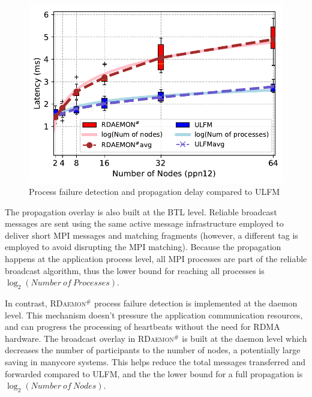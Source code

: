 \documentclass[sigconf]{acmart}
\newcommand{\ulfm}[0]{\textsc{ULFM}\xspace}
\newcommand{\mpi}[0]{\textsc{MPI}\xspace}
\newcommand{\ourwork}[0]{\textsc{RDaemon}\ensuremath{^\#}\xspace}
\begin{document}
\begin{figure}[h]
  \centering
  \includegraphics[width=\linewidth]{Process_Failure_log_fit.pdf}
  \caption{Process failure detection and propagation delay compared to \ulfm}
  \label{fig:proc_failure_nacl}
\end{figure}

The propagation overlay is also built at the BTL level. Reliable broadcast
messages are sent using the same active message infrastructure employed to
deliver short \mpi messages and matching fragments (however, a different
tag is employed to avoid disrupting the \mpi matching). Because the
propagation happens at the application process level, all \mpi processes
are part of the reliable broadcast algorithm, thus the lower bound for reaching
all processes is $\log_2({Number\ of\ Processes})$.

In contrast, \ourwork process failure detection is implemented at the daemon
level. This mechanism doesn't pressure the application communication resources,
and can progress the processing of heartbeats without the need for
RDMA hardware. The broadcast overlay in \ourwork is built at the daemon
level which decreases the number of participants to the number of nodes, a potentially
large saving in manycore systems. This helps reduce
the total messages transferred and forwarded compared to \ulfm, and the
 the lower bound for a full propagation is $\log_2({Number\ of\ Nodes})$.
\end{document}

